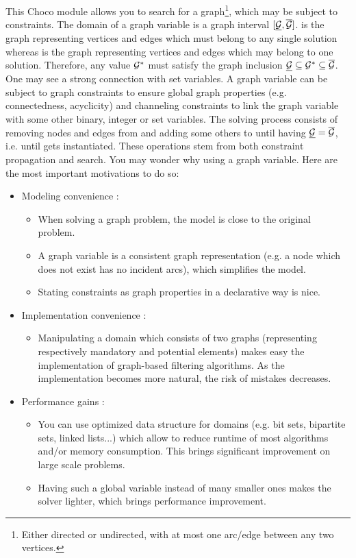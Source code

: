 \documentclass{article}
\begin{document}
This Choco module allows you to search for a graph\footnote{Either directed or undirected, with at most one arc/edge between any two vertices. }, which may be subject to constraints. 
%
The domain of a graph variable \GV{} is a graph interval $[\underline{\mathcal{G}}{},\overline{\mathcal{G}}{}]$. \GLB{} is the graph representing vertices and edges which must belong to any single solution whereas \GUB{} is the graph representing vertices and edges which may belong to one solution. Therefore, any value $\mathcal{G}{}^*$ must satisfy the graph inclusion $\underline{\mathcal{G}}{} \subseteq \mathcal{G}{}^* \subseteq \overline{\mathcal{G}}{}$. One may see a strong connection with set variables.
%
A graph variable can be subject to graph constraints to ensure global graph properties (e.g. connectedness, acyclicity) and channeling constraints to link the graph variable with some other binary, integer or set variables. 
%
The solving process consists of removing nodes and edges from \GUB{} and adding some others to \GLB{} until having $\underline{\mathcal{G}}{} = \overline{\mathcal{G}}{}$, i.e. until \GV{} gets instantiated. These operations stem from both constraint propagation and search. You may wonder why using a graph variable. Here are the most important motivations to do so:
\begin{itemize}
\item Modeling convenience : 
\begin{itemize}
\item When solving a graph problem, the model is close to the original problem. 
\item A graph variable is a consistent graph representation (e.g. a node which does not exist has no incident arcs), which simplifies the model. 
\item Stating constraints as graph properties in a declarative way is nice. 
\end{itemize}
\item Implementation convenience : 
\begin{itemize}
\item Manipulating a domain which consists of two graphs (representing respectively mandatory and potential elements) makes easy the implementation of graph-based filtering algorithms. As the implementation becomes more natural, the risk of mistakes decreases.
\end{itemize}
\item Performance gains : 
\begin{itemize}
\item You can use optimized data structure for domains (e.g. bit sets, bipartite sets, linked lists...) which allow to reduce runtime of most algorithms and/or memory consumption. This brings significant improvement on large scale problems. 
\item Having such a global variable instead of many smaller ones makes the solver lighter, which brings performance improvement.
\end{itemize}
\end{itemize}
\end{document}
